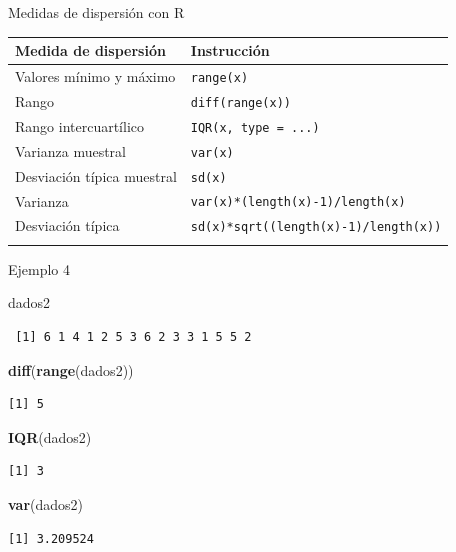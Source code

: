 \documentclass[
  ignorenonframetext,
  aspectratio=169]{beamer}
\newenvironment{Shaded}{\begin{snugshade}}{\end{snugshade}}
\newcommand{\FunctionTok}[1]{\textcolor[rgb]{0.13,0.29,0.53}{\textbf{#1}}}
\newcommand{\NormalTok}[1]{#1}
\begin{document}
\begin{frame}[fragile]{Medidas de dispersión con R}
\label{medidas-de-dispersiuxf3n-con-r}
\begin{longtable}[]{@{}ll@{}}
\toprule\noalign{}
Medida de dispersión & Instrucción \\
\midrule\noalign{}
\endhead
Valores mínimo y máximo & \texttt{range(x)} \\
Rango & \texttt{diff(range(x))} \\
Rango intercuartílico & \texttt{IQR(x,\ type\ =\ ...)} \\
Varianza muestral & \texttt{var(x)} \\
Desviación típica muestral & \texttt{sd(x)} \\
Varianza & \texttt{var(x)*(length(x)-1)/length(x)} \\
Desviación típica & \texttt{sd(x)*sqrt((length(x)-1)/length(x))} \\
\bottomrule\noalign{}
\end{longtable}
\end{frame}

\begin{frame}[fragile]{Ejemplo 4}
\label{ejemplo-4-9}
\begin{Shaded}
\begin{Highlighting}[]
\NormalTok{dados2}
\end{Highlighting}
\end{Shaded}

\begin{verbatim}
 [1] 6 1 4 1 2 5 3 6 2 3 3 1 5 5 2
\end{verbatim}

\begin{Shaded}
\begin{Highlighting}[]
\FunctionTok{diff}\NormalTok{(}\FunctionTok{range}\NormalTok{(dados2))}
\end{Highlighting}
\end{Shaded}

\begin{verbatim}
[1] 5
\end{verbatim}

\begin{Shaded}
\begin{Highlighting}[]
\FunctionTok{IQR}\NormalTok{(dados2)}
\end{Highlighting}
\end{Shaded}

\begin{verbatim}
[1] 3
\end{verbatim}

\begin{Shaded}
\begin{Highlighting}[]
\FunctionTok{var}\NormalTok{(dados2)}
\end{Highlighting}
\end{Shaded}

\begin{verbatim}
[1] 3.209524
\end{verbatim}
\end{frame}
\end{document}
